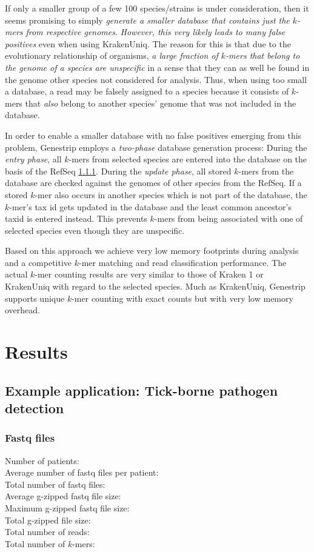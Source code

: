\documentclass[
	a4paper, %
	10pt, %
	unnumberedsections, %
	twoside, %
]{LTJournalArticle}
\begin{document}
If only a smaller group of a few 100 species/strains is under consideration, then it seems promising to simply \emph{generate a smaller database that contains just the $k$-mers from respective genomes}. \emph{However, this very likely leads to many false positives} even when using KrakenUniq. The reason for this is that due to the evolutionary relationship of organisms, \emph{a large fraction of $k$-mers that belong to the genome of a species are unspecific} in a sense that they can as well be found in the genome other species not considered for analysis. Thus, when using too small a database, a read may be falsely assigned to a species because it consists of $k$-mers that \emph{also} belong to another species' genome that was not included in the database.
 
In order to enable a smaller database with no false positives emerging from this problem, Genestrip employs a \emph{two-phase} database generation process: During the \emph{entry phase}, all $k$-mers from selected species are entered into the database on the basis of the RefSeq \ref{}. During the \emph{update phase}, all stored $k$-mers from the database are checked against the genomes of other species from the RefSeq. If a stored $k$-mer also occurs in another species which is not part of the database, the $k$-mer's tax id gets updated in the database and the least common ancestor's taxid is entered instead. This prevents $k$-mers from being associated with one of selected species even though they are unspecific.

Based on this approach we achieve very low memory footprints during analysis and a competitive $k$-mer matching and read classification performance. The actual $k$-mer counting results are very similar to those of Kraken 1 or KrakenUniq with regard to the selected species. Much as KrakenUniq, Genestrip supports unique $k$-mer counting with exact counts but with very low memory overhead.

\section{Results}\label{results}

\subsection{Example application: Tick-borne pathogen detection}

\subsubsection{Fastq files}
Number of patients:\\
Average number of fastq files per patient:\\
Total number of fastq files:\\
Average g-zipped fastq file size:\\
Maximum g-zipped fastq file size:\\
Total g-zipped file size:\\
Total number of reads:\\
Total number of $k$-mers:\\
\end{document}
